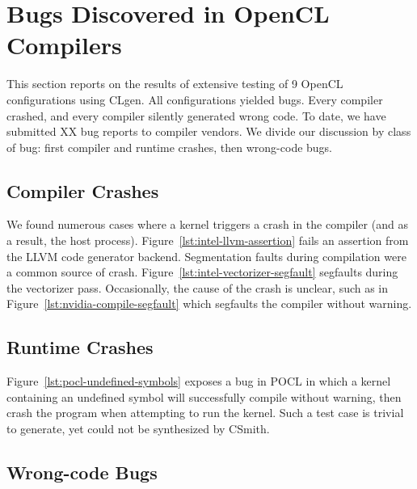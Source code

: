 \section{Bugs Discovered in OpenCL Compilers}

This section reports on the results of extensive testing of 9 OpenCL configurations using CLgen. All configurations yielded bugs. Every compiler crashed, and every compiler silently generated wrong code. To date, we have submitted XX bug reports to compiler vendors. We divide our discussion by class of bug: first compiler and runtime crashes, then wrong-code bugs.

\subsection{Compiler Crashes}

We found numerous cases where a kernel triggers a crash in the compiler (and as a result, the host process). Figure~\ref{lst:intel-llvm-assertion} fails an assertion from the LLVM code generator backend. Segmentation faults during compilation were a common source of crash. Figure~\ref{lst:intel-vectorizer-segfault} segfaults during the vectorizer pass. Occasionally, the cause of the crash is unclear, such as in Figure~\ref{lst:nvidia-compile-segfault} which segfaults the compiler without warning.


\subsection{Runtime Crashes}

Figure~\ref{lst:pocl-undefined-symbols} exposes a bug in POCL in which a kernel containing an undefined symbol will successfully compile without warning, then crash the program when attempting to run the kernel. Such a test case is trivial to generate, yet could not be synthesized by CSmith.

\subsection{Wrong-code Bugs}



